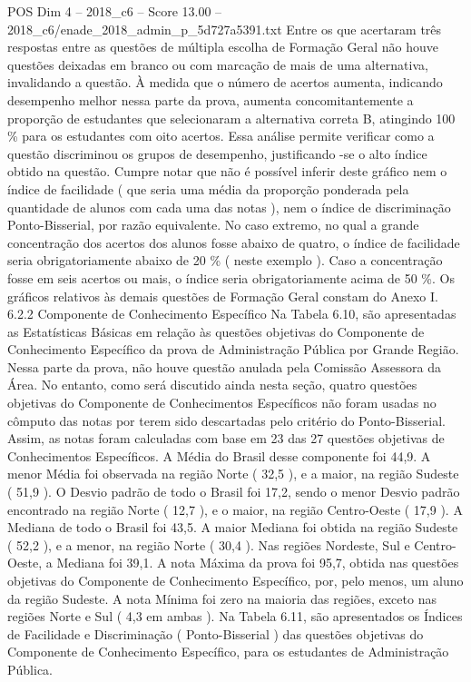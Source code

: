 \begin{textsample}{POS Dim 4 – 2018\_c6 – Score 13.00 – 2018\_c6/enade\_2018\_admin\_p\_5d727a5391.txt}
Entre os que acertaram três respostas entre as questões de múltipla escolha de Formação Geral não houve questões deixadas em branco ou com marcação de mais de uma alternativa, invalidando a questão.
À medida que o número de acertos aumenta, indicando desempenho melhor nessa parte da prova, aumenta concomitantemente a proporção de estudantes que selecionaram a alternativa correta B, atingindo 100 \% para os estudantes com oito acertos.
Essa análise permite verificar como a questão discriminou os grupos de desempenho, justificando -se o alto índice obtido na questão.
Cumpre notar que não é possível inferir deste gráfico nem o índice de facilidade ( que seria uma média da proporção ponderada pela quantidade de alunos com cada uma das notas ), nem o índice de discriminação Ponto-Bisserial, por razão equivalente.
No caso extremo, no qual a grande concentração dos acertos dos alunos fosse abaixo de quatro, o índice de facilidade seria obrigatoriamente abaixo de 20 \% ( neste exemplo ).
Caso a concentração fosse em seis acertos ou mais, o índice seria obrigatoriamente acima de 50 \%.
Os gráficos relativos às demais questões de Formação Geral constam do Anexo I. 6.2.2 Componente de Conhecimento Específico Na Tabela 6.10, são apresentadas as Estatísticas Básicas em relação às questões objetivas do Componente de Conhecimento Específico da prova de Administração Pública por Grande Região.
Nessa parte da prova, não houve questão anulada pela Comissão Assessora da Área.
No entanto, como será discutido ainda nesta seção, quatro questões objetivas do Componente de Conhecimentos Específicos não foram usadas no cômputo das notas por terem sido descartadas pelo critério do Ponto-Bisserial.
Assim, as notas foram calculadas com base em 23 das 27 questões objetivas de Conhecimentos Específicos.
A Média do Brasil desse componente foi 44,9.
A menor Média foi observada na região Norte ( 32,5 ), e a maior, na região Sudeste ( 51,9 ).
O Desvio padrão de todo o Brasil foi 17,2, sendo o menor Desvio padrão encontrado na região Norte ( 12,7 ), e o maior, na região Centro-Oeste ( 17,9 ).
A Mediana de todo o Brasil foi 43,5.
A maior Mediana foi obtida na região Sudeste ( 52,2 ), e a menor, na região Norte ( 30,4 ).
Nas regiões Nordeste, Sul e Centro-Oeste, a Mediana foi 39,1.
A nota Máxima da prova foi 95,7, obtida nas questões objetivas do Componente de Conhecimento Específico, por, pelo menos, um aluno da região Sudeste.
A nota Mínima foi zero na maioria das regiões, exceto nas regiões Norte e Sul ( 4,3 em ambas ).
Na Tabela 6.11, são apresentados os Índices de Facilidade e Discriminação ( Ponto-Bisserial ) das questões objetivas do Componente de Conhecimento Específico, para os estudantes de Administração Pública.

\end{textsample}
